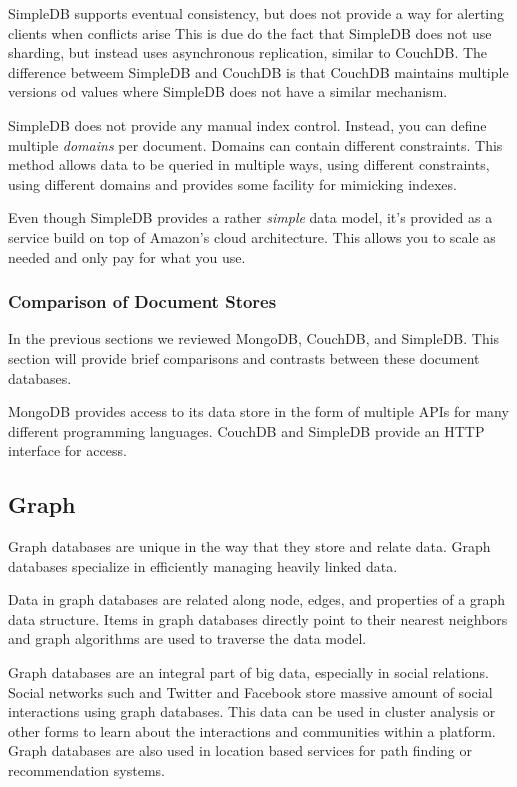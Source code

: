 \documentclass[]{article}
\begin{document}
SimpleDB supports eventual consistency, but does not provide a way for alerting clients when conflicts arise This is due do the fact that SimpleDB does not use sharding, but instead uses asynchronous replication, similar to CouchDB. The difference betweem SimpleDB and CouchDB is that CouchDB maintains multiple versions od values where SimpleDB does not have a similar mechanism.

SimpleDB does not provide any manual index control. Instead, you can define multiple \textit{domains} per document. Domains can contain different constraints. This method allows data to be queried in multiple ways, using different constraints, using different domains and provides some facility for mimicking indexes.

Even though SimpleDB provides a rather \textit{simple} data model, it's provided as a service build on top of Amazon's cloud architecture. This allows you to scale as needed and only pay for what you use. 

\subsubsection{Comparison of Document Stores}
In the previous sections we reviewed MongoDB, CouchDB, and SimpleDB. This section will provide brief comparisons and contrasts between these document databases.

MongoDB provides access to its data store in the form of multiple APIs for many different programming languages. CouchDB and SimpleDB provide an HTTP interface for access.

\subsection{Graph}\label{ssec:graph}
Graph databases are unique in the way that they store and relate data. Graph databases specialize in efficiently managing heavily linked data\cite{cattell_scalable_2011}.

Data in graph databases are related along node, edges, and properties of a graph data structure\cite{sharma_extended_2015}. Items in graph databases directly point to their nearest neighbors and graph algorithms are used to traverse the data model.

Graph databases are an integral part of big data, especially in social relations. Social networks such and Twitter and Facebook store massive amount of social interactions using graph databases. This data can be used in cluster analysis or other forms to learn about the interactions and communities within a platform. Graph databases are also used in location based services for path finding or recommendation systems\cite{cattell_scalable_2011}.
\end{document}
